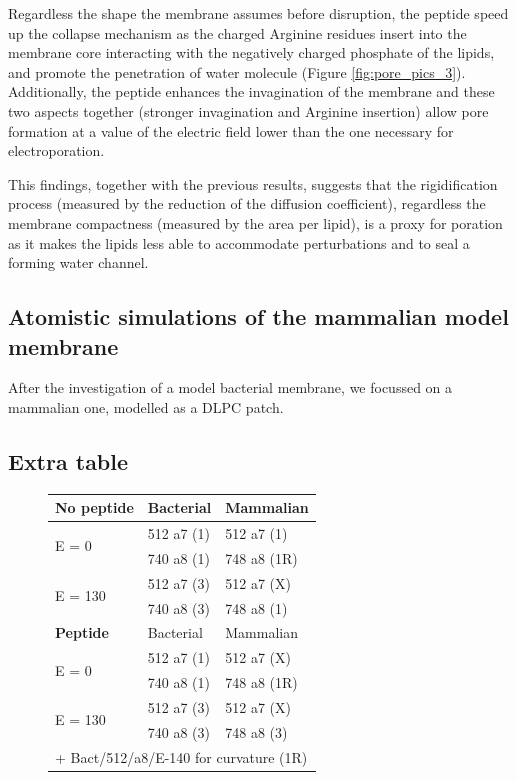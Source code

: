 Regardless the shape the membrane assumes before disruption, the peptide speed up the collapse mechanism as the charged Arginine residues insert into the membrane core interacting with the negatively charged phosphate of the lipids, and promote the penetration of water molecule (Figure \ref{fig:pore_pics_3}).
%
Additionally, the peptide enhances the invagination of the membrane and these two aspects together (stronger invagination and Arginine insertion) allow pore formation at a value of the electric field lower than the one necessary for electroporation.

This findings, together with the previous results, suggests that the rigidification process (measured by the reduction of the diffusion coefficient), regardless the membrane compactness (measured by the area per lipid), is a proxy for poration as it makes the lipids less able to accommodate perturbations and to seal a forming water channel.


\subsection{Atomistic simulations of the mammalian model membrane}

After the investigation of a model bacterial membrane, we focussed on a mammalian one, modelled as a DLPC patch. 



\subsection{Extra table}

\begin{figure}[t]
\centering
 \def\arraystretch{1.6}
\begin{tabular}{l|l|l}
\hline
 \textbf{No peptide} & Bacterial & Mammalian \\
 \hline
 \multirow{2}{*}{E = 0} & 512 a7 (1) & 512 a7 (1) \\
 & 740 a8 (1) & 748 a8 (1R) \\
 \hline
 \multirow{2}{*}{E = 130} & 512 a7 (3) & 512 a7 (X) \\
 & 740 a8 (3) & 748 a8 (1) \\
 \hline
 \hline
 \textbf{Peptide} & Bacterial & Mammalian \\
 \hline
 \multirow{2}{*}{E = 0} & 512 a7 (1) & 512 a7 (X) \\
 & 740 a8 (1) & 748 a8 (1R) \\
 \hline
 \multirow{2}{*}{E = 130} & 512 a7 (3) & 512 a7 (X) \\
 & 740 a8 (3) & 748 a8 (3) \\
 \hline
 \multicolumn{3}{l}{+ Bact/512/a8/E-140 for curvature (1R)}
 \end{tabular}
\label{table:sim_solution}
\end{figure}

